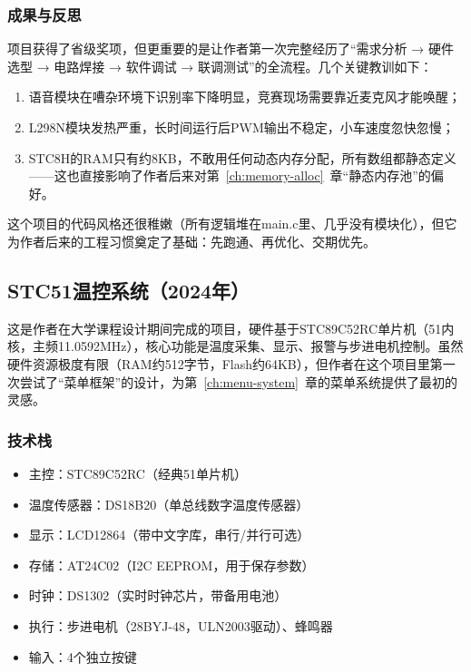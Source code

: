 \subsubsection{成果与反思}

项目获得了省级奖项，但更重要的是让作者第一次完整经历了“需求分析 → 硬件选型 → 电路焊接 → 软件调试 → 联调测试”的全流程。几个关键教训如下：

\begin{enumerate}
	\item 语音模块在嘈杂环境下识别率下降明显，竞赛现场需要靠近麦克风才能唤醒；
	\item L298N模块发热严重，长时间运行后PWM输出不稳定，小车速度忽快忽慢；
	\item STC8H的RAM只有约8KB，不敢用任何动态内存分配，所有数组都静态定义——这也直接影响了作者后来对第~\ref{ch:memory-alloc}~章“静态内存池”的偏好。
\end{enumerate}

这个项目的代码风格还很稚嫩（所有逻辑堆在main.c里、几乎没有模块化），但它为作者后来的工程习惯奠定了基础：先跑通、再优化、交期优先。


\subsection{STC51温控系统（2024年）}

这是作者在大学课程设计期间完成的项目，硬件基于STC89C52RC单片机（51内核，主频11.0592MHz），核心功能是温度采集、显示、报警与步进电机控制。虽然硬件资源极度有限（RAM约512字节，Flash约64KB），但作者在这个项目里第一次尝试了“菜单框架”的设计，为第~\ref{ch:menu-system}~章的菜单系统提供了最初的灵感。

\subsubsection{技术栈}

\begin{itemize}
	\item 主控：STC89C52RC（经典51单片机）
	\item 温度传感器：DS18B20（单总线数字温度传感器）
	\item 显示：LCD12864（带中文字库，串行/并行可选）
	\item 存储：AT24C02（I2C EEPROM，用于保存参数）
	\item 时钟：DS1302（实时时钟芯片，带备用电池）
	\item 执行：步进电机（28BYJ-48，ULN2003驱动）、蜂鸣器
	\item 输入：4个独立按键
\end{itemize}


